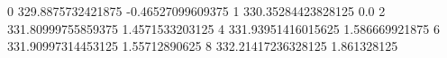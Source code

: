 0 329.8875732421875 -0.46527099609375
1 330.35284423828125 0.0
2 331.80999755859375 1.4571533203125
4 331.93951416015625 1.586669921875
6 331.90997314453125 1.55712890625
8 332.21417236328125 1.861328125
